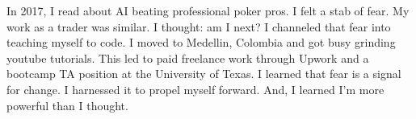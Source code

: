 

\begin{cvparagraph}

In 2017, I read about AI beating professional poker pros. I felt a stab of fear. My work as a trader was similar. I thought: am I next? I channeled that fear into teaching myself to code. I moved to Medellin, Colombia and got busy grinding youtube tutorials. This led to paid freelance work through Upwork and a bootcamp TA position at the University of Texas. I learned that fear is a signal for change. I harnessed it to propel myself forward. And, I learned I'm more powerful than I thought.
\end{cvparagraph}
